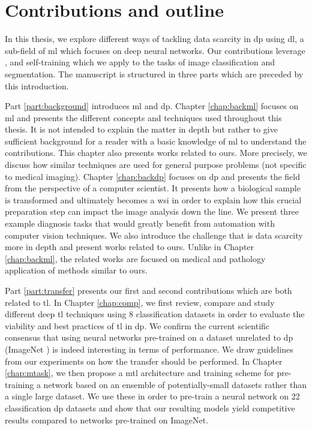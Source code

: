 \section{Contributions and outline}

In this thesis, we explore different ways of tackling data scarcity in \acrlong{dp} using \acrlong{dl}, a sub-field of \acrlong{ml} which focuses on deep neural networks. Our contributions leverage ,  and self-training which we apply to the tasks of image classification and segmentation. The manuscript is structured in three parts which are preceded by this introduction.

Part \ref{part:background} introduces \acrlong{ml} and \acrlong{dp}. Chapter \ref{chap:backml} focuses on \acrlong{ml} and presents the different concepts and techniques used throughout this thesis. It is not intended to explain the matter in depth but rather to give sufficient background for a reader with a basic knowledge of \acrlong{ml} to understand the contributions. This chapter also presents works related to ours. More precisely, we discuss how similar techniques are used for general purpose problems (\ie not specific to medical imaging). Chapter \ref{chap:backdp} focuses on \acrlong{dp} and presents the field from the perspective of a computer scientist. It presents how a biological sample is transformed and ultimately becomes a \acrlong{wsi} in order to explain how this crucial preparation step can impact the image analysis down the line. We present three example diagnosis tasks that would greatly benefit from automation with computer vision techniques. We also introduce the challenge that is data scarcity more in depth and present works related to ours. Unlike in Chapter \ref{chap:backml}, the related works are focused on medical and pathology application of methods similar to ours.

Part \ref{part:transfer} presents our first and second contributions which are both related to \acrlong{tl}. In Chapter \ref{chap:comp}, we first review, compare and study different deep \acrlong{tl} techniques using 8 classification datasets in order to evaluate the viability and best practices of \acrlong{tl} in \acrlong{dp}. We confirm the current scientific consensus that using neural networks pre-trained on a dataset unrelated to \acrlong{dp} (\ie ImageNet \cite{deng2009imagenet}) is indeed interesting in terms of performance. We draw guidelines from our experiments on how the transfer should be performed. In Chapter \ref{chap:mtask}, we then propose a \acrlong{mtl} architecture and training scheme for pre-training a network based on an ensemble of potentially-small datasets rather than a single large dataset. We use these in order to pre-train a neural network on 22 classification \acrlong{dp} datasets and show that our resulting models yield competitive results compared to networks pre-trained on ImageNet. 

